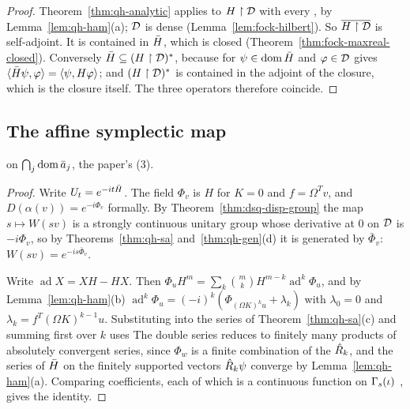 \begin{vetqenv}
\begin{proof}
Theorem~\ref{thm:qh-analytic} applies to $H\restriction\mathcal D$ with every , by Lemma~\ref{lem:qh-ham}(a); $\mathcal D$ is dense
(Lemma~\ref{lem:fock-hilbert}). So $\overline{H\restriction\mathcal D}$ is self-adjoint. It is contained in $\bar H$, which is closed
(Theorem~\ref{thm:fock-maxreal-closed}). Conversely $\bar H\subseteq(H\restriction\mathcal D)^*$, because for $\psi\in\operatorname{dom}\bar H$ and
$\varphi\in\mathcal D$  gives $\langle\bar H\psi,\varphi\rangle=\langle\psi,H\varphi\rangle$; and
$(H\restriction\mathcal D)^*$ is contained in the adjoint of the closure, which is the closure itself. The three operators therefore coincide.
\end{proof}

\subsection{The affine symplectic map}\label{sec:qh-main}

\begin{theorem}\label{thm:qh-main}
 on $\bigcap_j\operatorname{dom}\bar a_j$, the paper's (3).
\end{theorem}

\begin{proof}
Write $U_t=e^{-it\bar H}$. The field $\Phi_v$ is $H$ for $K=0$ and $f=\Omega^Tv$, and $D(\alpha(v))=e^{-i\Phi_v}$ formally. By
Theorem~\ref{thm:dsq-disp-group} the map $s\mapsto W(sv)$ is a strongly continuous unitary group whose derivative at $0$ on $\mathcal D$
is $-i\Phi_v$, so by Theorems~\ref{thm:qh-sa} and~\ref{thm:qh-gen}(d) it is generated by $\bar\Phi_v$: $W(sv)=e^{-is\bar\Phi_v}$.

 Write $\operatorname{ad}X=XH-HX$. Then
$\Phi_uH^m=\sum_k\binom mkH^{m-k}\operatorname{ad}^k\Phi_u$, and by Lemma~\ref{lem:qh-ham}(b)
$\operatorname{ad}^k\Phi_u=(-i)^k(\Phi_{(\Omega K)^ku}+\lambda_k)$ with $\lambda_0=0$ and $\lambda_k=f^T(\Omega K)^{k-1}u$. Substituting into the series of
Theorem~\ref{thm:qh-sa}(c) and summing first over $k$ uses \vetr{
\[
 \sum_k\frac{(-t)^k}{k!}(\Omega K)^ku=M(t)^{-1}u,\qquad\sum_{k\ge1}\frac{(-t)^k}{k!}\lambda_k=\sigma(u,d(t)).
\]}%
The double series reduces to finitely many products of absolutely convergent series, since
$\Phi_w$ is a finite combination of the $\hat R_k$, and the series of $\bar H$ on the finitely supported vectors $\hat R_k\psi$ converge by
Lemma~\ref{lem:qh-ham}(a). Comparing coefficients, each of which is a continuous function on $\Gamma_s(\iota)$ , gives the identity.


\end{proof}
\end{vetqenv}
